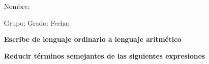 \documentclass[12pt,addpoints]{exam}
\begin{document}
Nombre:\enspace\hrulefill

\vspace{5mm}

Grupo:\enspace\hrulefill
\enspace{}Grado:\enspace\hrulefill
\enspace{}Fecha:\enspace\hrulefill

\begin{questions}

\begin{EnvFullwidth}
  \sffamily\textbf{Escribe de lenguaje ordinario a lenguaje aritmético}
\end{EnvFullwidth}











\begin{EnvFullwidth}
  \sffamily\textbf{Reducir términos semejantes de las siguientes expresiones}
\end{EnvFullwidth}





\end{questions}
\end{document}

